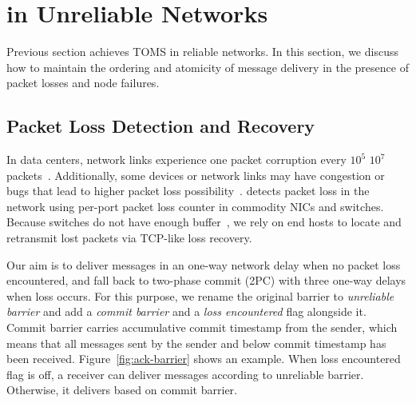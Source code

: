 \section{\sys in Unreliable Networks}
\label{sec:reliable}

Previous section achieves TOMS in reliable networks. In this section, we discuss how to maintain the ordering and atomicity of message delivery in the presence of packet losses and node failures.

\subsection{Packet Loss Detection and Recovery}
\label{sec:lossy}

In data centers, network links experience one packet corruption every $10^5$ \texttildelow $10^7$ packets~\cite{zhuo2017understanding}.
Additionally, some devices or network links may have congestion or bugs that lead to higher packet loss possibility~\cite{guo2015pingmesh}.
\sys detects packet loss in the network using per-port packet loss counter in commodity NICs and switches. Because switches do not have enough buffer~\cite{bai2017congestion}, we rely on end hosts to locate and retransmit lost packets via TCP-like loss recovery.

Our aim is to deliver messages in an one-way network delay when no packet loss encountered, and fall back to two-phase commit (2PC) with three one-way delays when loss occurs. For this purpose, we rename the original barrier to \textit{unreliable barrier} and add a \textit{commit barrier} and a \textit{loss encountered} flag alongside it. Commit barrier carries accumulative commit timestamp from the sender, which means that all messages sent by the sender and below commit timestamp has been received. Figure~\ref{fig:ack-barrier} shows an example. When loss encountered flag is off, a receiver can deliver messages according to unreliable barrier. Otherwise, it delivers based on commit barrier.


